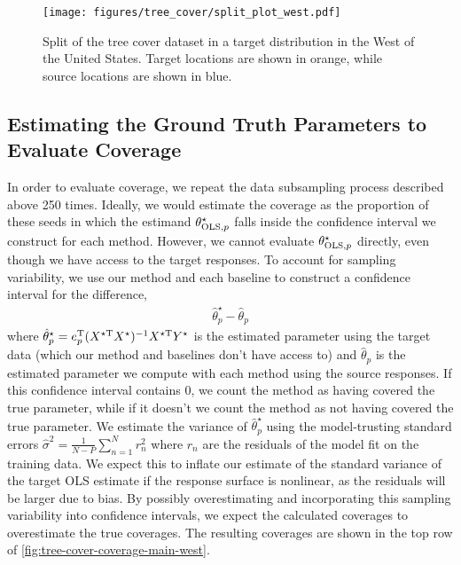 \begin{figure*}
    \centering    \texttt{[image: figures/tree\_cover/split\_plot\_west.pdf]}
    \caption{Split of the tree cover dataset in a target distribution in the West of the United States. Target locations are shown in orange, while source locations are shown in blue.}
    \label{fig:tree-cover-split-west}
\end{figure*}

\subsection{Estimating the Ground Truth Parameters to Evaluate Coverage}
\label{app:real-data-coverage-computation}

In order to evaluate coverage, we repeat the data subsampling process described above 250 times. Ideally, we would estimate the coverage as the proportion of these seeds in which the estimand $\theta^{\star}_{\text{OLS},p}$ falls inside the confidence interval we construct for each method. However, we cannot evaluate $\theta^{\star}_{\text{OLS},p}$ directly, even though we have access to the target responses. To account for sampling variability, we use our method and each baseline to construct a confidence interval for the difference,
\begin{align}
    \hat{\theta}_p^{\star} - \hat{\theta}_p
\end{align}
where $\hat{\theta}_p^{\star} = e_p^{\mathrm{T}}(X^{\star\mathrm{T}} X^{\star})^{-1}X^{\star\mathrm{T}}Y^{\star}$ is the estimated parameter using the target data (which our method and baselines don't have access to) and $\hat{\theta}_p$ is the estimated parameter we compute with each method using the source responses. If this confidence interval contains $0$, we count the method as having covered the true parameter, while if it doesn't we count the method as not having covered the true parameter. We estimate the variance of $\hat{\theta}_p^{\star}$ using the model-trusting standard errors $\hat{\sigma}^2 = \frac{1}{N-P} \sum_{n=1}^N r_n^2$ where $r_n$ are the residuals of the model fit on the training data. We expect this to inflate our estimate of the standard variance of the target OLS estimate if the response surface is nonlinear, as the residuals will be larger due to bias. By possibly overestimating and incorporating this sampling variability into confidence intervals, we expect the calculated coverages to overestimate the true coverages. The resulting coverages are shown in the top row of \cref{fig:tree-cover-coverage-main-west}.

